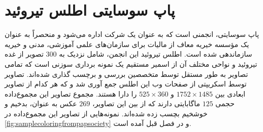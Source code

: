\section{پاپ سوسایتی اطلس تیروئید}\label{subsec:پاپ-سوسایتی}
پاپ سوسایتی، انجمنی است که به عنوان یک شرکت اداره می‌شود و منحصراً به عنوان یک مؤسسه خیریه معاف از مالیات برای سازمان‌های علمی آموزشی، مدنی و خیریه سازماندهی شده است.
اطلس تیروئید این انجمن\cite{papsocietyiamgeatlas}، شامل نزدیک به 300 تصویر از غده تیروئید و نواحی مختلف آن از اسمیر مستقیم یک نمونه برداری سوزنی است که تمامی تصاویر به طور مستقل توسط متخصصین بررسی و برچسب گذاری شده‌اند.
تصاویر توسط اسکریپتی از صفحات وب این اطلس جمع آوری شد و که هر کدام از تصاویر ابعادی بین
 $1752\times1485$
 و
 $525\times360$
 را دارا هستند.
مجموع تصاویر این مجموع‌داده حجمی $125$ ماگابایتی دارند که از بین این تصاویر، $269$ عکس به عنوان، بدخیم و خوشخیم بچسب زده شده‌اند.
نمونه‌هایی از تصاویر این مجموع‌داده در \ref{fig:samplecoloringfrompapsociety}  و در فصل قبل آمده است.
